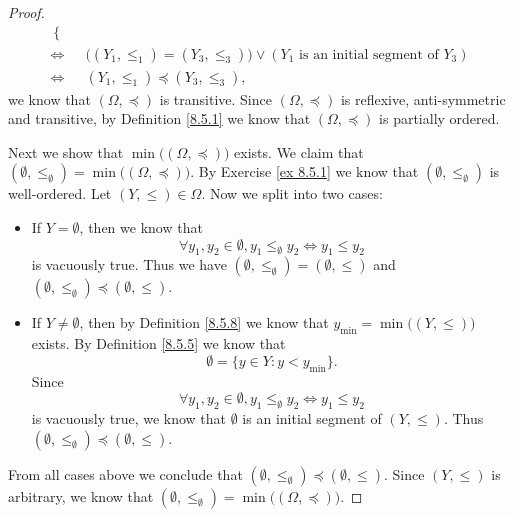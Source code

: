 \begin{proof}
\begin{align*}
\begin{cases}
               \end{cases}                                                                                 \\
        \iff & \big((Y_1, \leq_1) = (Y_3, \leq_3)\big) \lor (Y_1 \text{ is an initial segment of } Y_3)                                                                          \\
        \iff & (Y_1, \leq_1) \preceq (Y_3, \leq_3),
    \end{align*}
    we know that \((\Omega, \preceq)\) is transitive.
    Since \((\Omega, \preceq)\) is reflexive, anti-symmetric and transitive, by Definition \ref{8.5.1} we know that \((\Omega, \preceq)\) is partially ordered.

    Next we show that \(\min\big((\Omega, \preceq)\big)\) exists.
    We claim that \((\emptyset, \leq_{\emptyset}) = \min\big((\Omega, \preceq)\big)\).
    By Exercise \ref{ex 8.5.1} we know that \((\emptyset, \leq_{\emptyset})\) is well-ordered.
    Let \((Y, \leq) \in \Omega\).
    Now we split into two cases:
    \begin{itemize}
        \item If \(Y = \emptyset\), then we know that
              \[
                  \forall y_1, y_2 \in \emptyset, y_1 \leq_{\emptyset} y_2 \iff y_1 \leq y_2
              \]
              is vacuously true.
              Thus we have \((\emptyset, \leq_{\emptyset}) = (\emptyset, \leq)\) and \((\emptyset, \leq_{\emptyset}) \preceq (\emptyset, \leq)\).
        \item If \(Y \neq \emptyset\), then by Definition \ref{8.5.8} we know that \(y_{\min} = \min\big((Y, \leq)\big)\) exists.
              By Definition \ref{8.5.5} we know that
              \[
                  \emptyset = \{y \in Y : y < y_{\min}\}.
              \]
              Since
              \[
                  \forall y_1, y_2 \in \emptyset, y_1 \leq_{\emptyset} y_2 \iff y_1 \leq y_2
              \]
              is vacuously true, we know that \(\emptyset\) is an initial segment of \((Y, \leq)\).
              Thus \((\emptyset, \leq_{\emptyset}) \preceq (\emptyset, \leq)\).
    \end{itemize}
    From all cases above we conclude that \((\emptyset, \leq_{\emptyset}) \preceq (\emptyset, \leq)\).
    Since \((Y, \leq)\) is arbitrary, we know that \((\emptyset, \leq_{\emptyset}) = \min\big((\Omega, \preceq)\big)\).


\end{proof}
